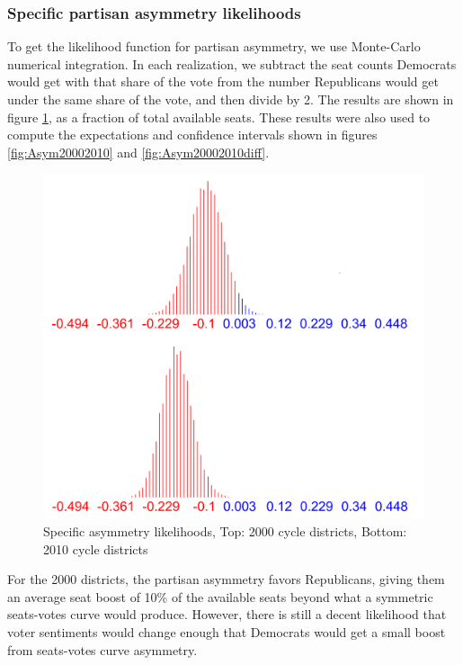 \documentclass[preprint,12pt]{article}
\begin{document}
\subsubsection{Specific partisan asymmetry likelihoods}
 
To get the likelihood function for partisan asymmetry, we use Monte-Carlo numerical integration.
In each realization, we subtract the seat counts Democrats would get with that share of the vote from the number Republicans would get under the same share of the vote, and then divide by 2. 
The results are shown in figure \ref{fig:LikelihoodsAsymmetry}, as a fraction of total available seats.  These results were also used to compute the expectations and confidence intervals shown in figures \ref{fig:Asym20002010} and \ref{fig:Asym20002010diff}.
 
\begin{figure}[htb!]
    \begin{center}
        \includegraphics[scale=0.25]{../Figures/WI_compared/asymmetry_cropped.png}
        \caption{Specific asymmetry likelihoods, Top: 2000 cycle districts, Bottom: 2010 cycle districts}\label{fig:LikelihoodsAsymmetry}
    \end{center}
\end{figure}
 
For the 2000 districts, the partisan asymmetry favors Republicans, giving them an average seat boost of 10\% of the available seats beyond what a symmetric seats-votes curve would produce.  
However, there is still a decent likelihood that voter sentiments would change enough that Democrats would get a small boost from seats-votes curve asymmetry.
\end{document}
